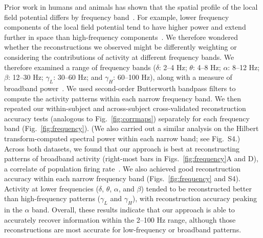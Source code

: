 \documentclass[11pt]{article}
\newcommand{\freqpower}{S4}
\begin{document}
Prior work in humans and animals has shown that the spatial profile of
the local field potential differs by frequency band~\citep[e.g., with
respect to volume conductance properties and contribution to the local
field potential;][]{BuzsEtal12, FrieEtal07, CronEtal11}.  For example,
lower frequency components of the local field potential tend to have
higher power and extend further in space than high-frequency
components~\citep[e.g., ][]{MillEtal07, MannEtal09}.  We therefore
wondered whether the reconstructions we observed might be differently
weighting or considering the contributions of activity at different
frequency bands.  We therefore examined a range of frequency bands
($\delta$: 2--4 Hz; $\theta$: 4--8 Hz; $\alpha$: 8--12 Hz; $\beta$:
12--30 Hz; $\gamma_L$: 30--60 Hz; and $\gamma_H$: 60--100 Hz), along
with a measure of broadband power~\citep[defined as the mean height of
a linear robust regression fit in log-log space to the order 4 Morelet
wavelet-computed power spectrum at 50 log-spaced frequencies from from
2--100 Hz;][]{MannEtal09}.  We used second-order Butterworth bandpass
filters to compute the activity patterns within each narrow frequency
band.  We then repeated our within-subject and across-subject
cross-validated reconstruction accuracy tests (analogous to
Fig.~\ref{fig:corrmaps}) separately for each frequency band
(Fig.~\ref{fig:frequency}).  (We also carried out a similar analysis
on the Hilbert transform-computed spectral power within each narrow
band; see Fig.~\freqpower.)  Across both datasets, we found that our
approach is best at reconstructing patterns of broadband activity
(right-most bars in Figs.~\ref{fig:frequency}A and D), a correlate of
population firing rate~\citep{MannEtal09}.  We also achieved good
reconstruction accuracy within each narrow frequency band
(Figs.~\ref{fig:frequency} and \freqpower).  Activity at lower
frequencies ($\delta$, $\theta$, $\alpha$, and $\beta$) tended to be
reconstructed better than high-frequency patterns ($\gamma_L$ and
$\gamma_H$), with reconstruction accuracy peaking in the $\alpha$
band.  Overall, these results indicate that our approach is able to
accurately recover information within the 2--100 Hz range, although
those reconstructions are most accurate for low-frequency or broadband patterns.
\end{document}
